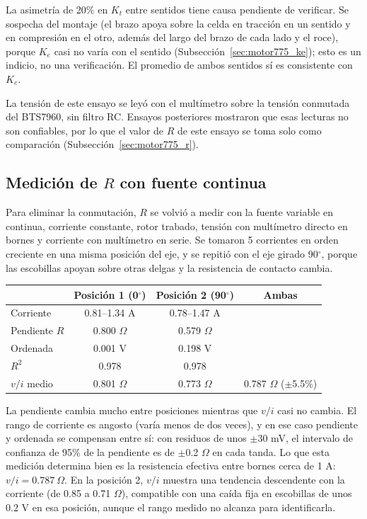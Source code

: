 La asimetría de 20\% en $K_t$ entre sentidos tiene causa pendiente de verificar. Se sospecha del montaje (el brazo apoya sobre la celda en tracción en un sentido y en compresión en el otro, además del largo del brazo de cada lado y el roce), porque $K_e$ casi no varía con el sentido (Subsección~\ref{sec:motor775_ke}); esto es un indicio, no una verificación. El promedio de ambos sentidos sí es consistente con $K_e$.

La tensión de este ensayo se leyó con el multímetro sobre la tensión conmutada del BTS7960, sin filtro RC. Ensayos posteriores mostraron que esas lecturas no son confiables, por lo que el valor de $R$ de este ensayo se toma solo como comparación (Subsección~\ref{sec:motor775_r}).

\subsection{Medición de $R$ con fuente continua}
\label{sec:motor775_rdc}
Para eliminar la conmutación, $R$ se volvió a medir con la fuente variable en continua, corriente constante, rotor trabado, tensión con multímetro directo en bornes y corriente con multímetro en serie. Se tomaron 5 corrientes en orden creciente en una misma posición del eje, y se repitió con el eje girado 90$^\circ$, porque las escobillas apoyan sobre otras delgas y la resistencia de contacto cambia.

\begin{center}
\begin{tabular}{lccc}\toprule
& Posición 1 (0$^\circ$) & Posición 2 (90$^\circ$) & Ambas\\\midrule
Corriente & 0.81--1.34 A & 0.78--1.47 A & \\
Pendiente $R$ & 0.800 $\Omega$ & 0.579 $\Omega$ & \\
Ordenada & 0.001 V & 0.198 V & \\
$R^2$ & 0.978 & 0.978 & \\
$v/i$ medio & 0.801 $\Omega$ & 0.773 $\Omega$ & 0.787 $\Omega$ ($\pm$5.5\%)\\\bottomrule
\end{tabular}
\end{center}

La pendiente cambia mucho entre posiciones mientras que $v/i$ casi no cambia. El rango de corriente es angosto (varía menos de dos veces), y en ese caso pendiente y ordenada se compensan entre sí: con residuos de unos $\pm$30 mV, el intervalo de confianza de 95\% de la pendiente es de $\pm$0.2 $\Omega$ en cada tanda. Lo que esta medición determina bien es la resistencia efectiva entre bornes cerca de 1 A: $v/i = 0.787\ \Omega$. En la posición 2, $v/i$ muestra una tendencia descendente con la corriente (de 0.85 a 0.71 $\Omega$), compatible con una caída fija en escobillas de unos 0.2 V en esa posición, aunque el rango medido no alcanza para identificarla.

